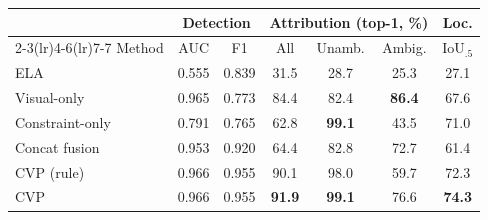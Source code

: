 \begin{tabular}{lcccccc}
\toprule
 & \multicolumn{2}{c}{Detection} & \multicolumn{3}{c}{Attribution (top-1, \%)} & Loc.\\
\cmidrule(lr){2-3}\cmidrule(lr){4-6}\cmidrule(lr){7-7}
Method & AUC & F1 & All & Unamb. & Ambig. & IoU$_{.5}$\\
\midrule
ELA & 0.555 & 0.839 & 31.5 & 28.7 & 25.3 & 27.1\\
Visual-only & 0.965 & 0.773 & 84.4 & 82.4 & \textbf{86.4} & 67.6\\
Constraint-only & 0.791 & 0.765 & 62.8 & \textbf{99.1} & 43.5 & 71.0\\
Concat fusion & 0.953 & 0.920 & 64.4 & 82.8 & 72.7 & 61.4\\
CVP (rule) & 0.966 & 0.955 & 90.1 & 98.0 & 59.7 & 72.3\\
CVP & 0.966 & 0.955 & \textbf{91.9} & \textbf{99.1} & 76.6 & \textbf{74.3}\\
\bottomrule
\end{tabular}
